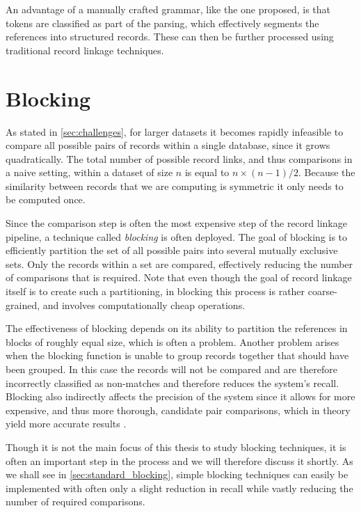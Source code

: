 An advantage of a manually crafted grammar, like the one proposed, is that tokens are classified as part of the parsing, which effectively segments the references into structured records.
These can then be further processed using traditional record linkage techniques.




\section{Blocking}
\label{sec:blocking}

As stated in \cref{sec:challenges}, for larger datasets it becomes rapidly infeasible to compare all possible pairs of records within a single database, since it grows quadratically.
The total number of possible record links, and thus comparisons in a naive setting, within a dataset of size $n$ is equal to $n\times(n-1)/2$.
Because the similarity between records that we are computing is symmetric it only needs to be computed once.

Since the comparison step is often the most expensive step of the record linkage pipeline, a technique called \emph{blocking} is often deployed.
The goal of blocking is to efficiently partition the set of all possible pairs into several mutually exclusive sets.
Only the records within a set are compared, effectively reducing the number of comparisons that is required.
Note that even though the goal of record linkage itself is to create such a partitioning, in blocking this process is rather coarse-grained, and involves computationally cheap operations.

The effectiveness of blocking depends on its ability to partition the references in blocks of roughly equal size, which is often a problem.
Another problem arises when the blocking function is unable to group records together that should have been grouped.
In this case the records will not be compared and are therefore incorrectly classified as non-matches and therefore reduces the system's recall.
Blocking also indirectly affects the precision of the system since it allows for more expensive, and thus more thorough, candidate pair comparisons, which in theory yield more accurate results \citep{Baxter2003}.

Though it is not the main focus of this thesis to study blocking techniques, it is often an important step in the process and we will therefore discuss it shortly.
As we shall see in \cref{sec:standard_blocking}, simple blocking techniques can easily be implemented with often only a slight reduction in recall while vastly reducing the number of required comparisons.


